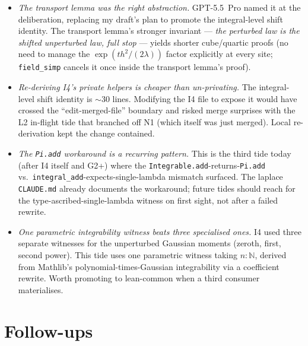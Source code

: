 \documentclass[11pt]{article}
\begin{document}
\begin{itemize}
\item \emph{The transport lemma was the right abstraction.} GPT-5.5~Pro
  named it at the deliberation, replacing my draft's plan to promote
  the integral-level shift identity. The transport lemma's stronger
  invariant — \emph{the perturbed law is the shifted unperturbed law,
  full stop} — yields shorter cube/quartic proofs (no need to manage
  the $\exp(t h^2/(2\lambda))$ factor explicitly at every site;
  \texttt{field\_simp} cancels it once inside the transport lemma's
  proof).
\item \emph{Re-deriving I4's private helpers is cheaper than
  un-privating.} The integral-level shift identity is $\sim$30 lines.
  Modifying the I4 file to expose it would have crossed the
  ``edit-merged-file'' boundary and risked merge surprises with the
  L2 in-flight tide that branched off N1 (which itself was just
  merged). Local re-derivation kept the change contained.
\item \emph{The \texttt{Pi.add} workaround is a recurring pattern.}
  This is the third tide today (after I4 itself and G2+) where the
  \texttt{Integrable.add}-returns-\texttt{Pi.add} vs.\
  \texttt{integral\_add}-expects-single-lambda mismatch surfaced. The
  laplace \texttt{CLAUDE.md} already documents the workaround; future
  tides should reach for the type-ascribed-single-lambda witness on
  first sight, not after a failed rewrite.
\item \emph{One parametric integrability witness beats three
  specialised ones.} I4 used three separate witnesses for the
  unperturbed Gaussian moments (zeroth, first, second power). This
  tide uses one parametric witness taking $n : \mathbb N$, derived
  from Mathlib's polynomial-times-Gaussian integrability via a
  coefficient rewrite. Worth promoting to lean-common when a third
  consumer materialises.
\end{itemize}

\section{Follow-ups}
\end{document}
